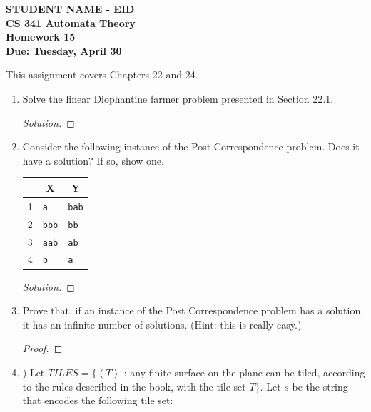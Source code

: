 \documentclass[10pt]{article}
\newcommand{\brackets}[1]{\left< #1 \right>}
\begin{document}
\begin{flushleft}
\textbf{\noindent
STUDENT NAME - EID\\
CS 341 Automata Theory \\
Homework 15 \\
Due: Tuesday, April 30}\\
\end{flushleft}

\noindent
This assignment covers Chapters 22 and 24.\\

\begin{enumerate}[1)]


\item
Solve the linear Diophantine farmer problem presented in Section 22.1.
\begin{proof}[Solution]
\end{proof}


\item
Consider the following instance of the Post Correspondence problem.  Does it have a solution?  If so, show one.\\
\begin{center}
\begin{tabular}{| p{1cm} | p{3cm} | p{3cm} |}
  \hline
  \multicolumn{1}{|c}{}&
  \multicolumn{1}{|c|}{X}&
  \multicolumn{1}{c|}{Y}\\
  \hline
  1&\texttt{a}&\texttt{bab}\\
  \hline
  2&\texttt{bbb}&\texttt{bb}\\
  \hline
  3&\texttt{aab}&\texttt{ab}\\
  \hline
  4&\texttt{b}&\texttt{a}\\
  \hline
\end{tabular}
\end{center}
\begin{proof}[Solution]
\end{proof}

\item
Prove that, if an instance of the Post Correspondence problem has a solution, it has an infinite number of solutions. (Hint: this is really easy.)
\begin{proof}[Proof]
\end{proof}


\item
) Let $TILES = \{\brackets{T}$ : any finite surface on the plane can be tiled, according to the rules described in the book, with the tile set $T$\}.  Let $s$ be the string that encodes the following tile set:\\


\end{enumerate}
\end{document}
